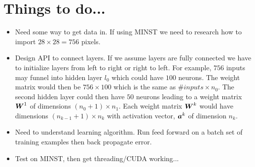 \documentclass[12pt,notitlepage]{article}
\begin{document}
\section{Things to do...}
\label{sec:things-to-do}
\begin{itemize}
\item Need some way to get data in.  If using MINST we need to
  research how to import $28 \times 28 = 756$ pixels.
\item Design API to connect layers.  If we assume layers are fully
  connected we have to initialize layers from left to right or right
  to left.  For example, $756$ inputs may funnel into hidden layer
  $l_0$ which could have $100$ neurons.  The weight matrix would then
  be $756 \times 100$ which is the same as $\#inputs \times n_{0}$.
  The second hidden layer could then have $50$ neurons leading to a
  weight matrix $\boldsymbol{W}^{1}$ of dimensions $(n_{0}+1) \times n_{1}$.
  Each weight matrix $\boldsymbol{W}^{k}$ would have dimensions $(n_{k-1}+1)
  \times n_{k}$ with activation vector, $\boldsymbol{a}^{k}$ of dimension
  $n_{k}$.
\item Need to understand learning algorithm.  Run feed forward on a
  batch set of training examples then back propagate error.

\item Test on MINST, then get threading/CUDA working...
\end{itemize}
\end{document}
